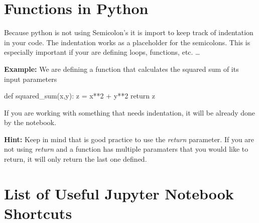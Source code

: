 \documentclass[
  letterpaper,
  DIV=11,
  numbers=noendperiod]{scrreprt}
\newenvironment{Shaded}{\begin{snugshade}}{\end{snugshade}}
\newcommand{\ControlFlowTok}[1]{\textcolor[rgb]{0.00,0.23,0.31}{#1}}
\newcommand{\DecValTok}[1]{\textcolor[rgb]{0.68,0.00,0.00}{#1}}
\newcommand{\KeywordTok}[1]{\textcolor[rgb]{0.00,0.23,0.31}{#1}}
\newcommand{\NormalTok}[1]{\textcolor[rgb]{0.00,0.23,0.31}{#1}}
\newcommand{\OperatorTok}[1]{\textcolor[rgb]{0.37,0.37,0.37}{#1}}
\begin{document}
\hypertarget{functions-in-python}{%
\section{Functions in Python}\label{functions-in-python}}

Because python is not using Semicolon's it is import to keep track of
indentation in your code. The indentation works as a placeholder for the
semicolons. This is especially important if your are defining loops,
functions, etc. \ldots{}

\textbf{Example:} We are defining a function that calculates the squared
sum of its input parameters

\begin{Shaded}
\begin{Highlighting}[]
\KeywordTok{def}\NormalTok{ squared\_sum(x,y): }
\NormalTok{    z }\OperatorTok{=}\NormalTok{ x}\OperatorTok{**}\DecValTok{2} \OperatorTok{+}\NormalTok{ y}\OperatorTok{**}\DecValTok{2}
    \ControlFlowTok{return}\NormalTok{ z}
\end{Highlighting}
\end{Shaded}

If you are working with something that needs indentation, it will be
already done by the notebook.

\textbf{Hint:} Keep in mind that is good practice to use the
\emph{return} parameter. If you are not using \emph{return} and a
function has multiple paramaters that you would like to return, it will
only return the last one defined.

\hypertarget{list-of-useful-jupyter-notebook-shortcuts}{%
\section{List of Useful Jupyter Notebook
Shortcuts}\label{list-of-useful-jupyter-notebook-shortcuts}}
\end{document}
